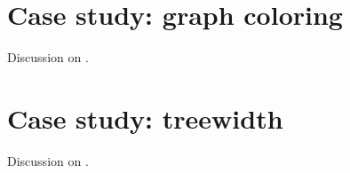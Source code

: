 \section{Case study: graph coloring}

\begin{frame}
	Discussion on \cite{HartungN13}.
	
	\slides{\vspace{8cm}}
\end{frame}

\section{Case study: treewidth}

\begin{frame}
	Discussion on \cite{GaspersGJMR19}.
	
	\slides{\vspace{8cm}}
\end{frame}


\begin{frame}[t, allowframebreaks]
	\printbibliography
\end{frame}



